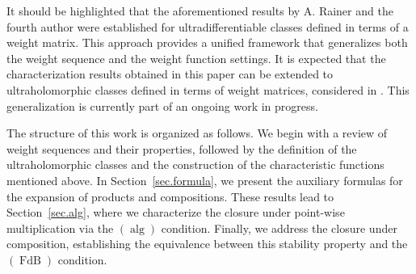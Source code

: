 \documentclass[11pt,a4paper]{article}
\theoremstyle{plain}
\theoremstyle{definition}
\let\on=\operatorname
\begin{document}
It should be highlighted that the aforementioned results by A. Rainer and the fourth author were established for ultradifferentiable classes defined in terms of a weight matrix. This approach provides a unified framework that generalizes both the weight sequence and the weight function settings. It is expected that the characterization results obtained in this paper can be extended to ultraholomorphic classes defined in terms of weight matrices, considered in \cite{sectorialextensions, sectorialextensions1}. This generalization is currently part of an ongoing work in progress.


The structure of this work is organized as follows. We begin with a review of weight sequences and their properties, followed by the definition of the ultraholomorphic classes and the construction of the characteristic functions mentioned above. In Section~\ref{sec.formula}, we present the auxiliary formulas for the expansion of products and compositions. These results lead to Section~\ref{sec.alg}, where we characterize the closure under point-wise multiplication via the \hyperlink{s-alg}{$(\on{alg})$} condition. Finally, we address the closure under composition, establishing the equivalence between this stability property and the \hyperlink{s-FdB}{$(\on{FdB})$} condition.
\end{document}

